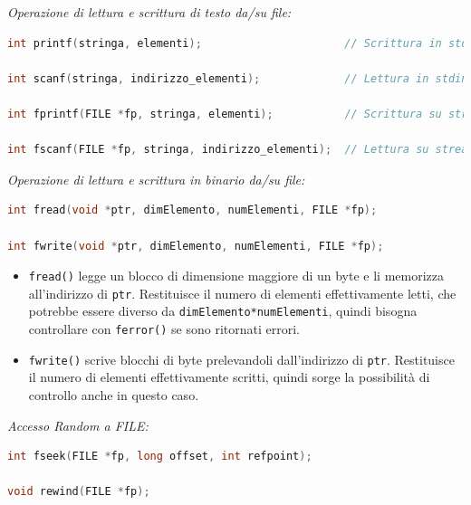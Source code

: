 \documentclass[
  paper=a4,
  oneside  ,captions=tableheading
]{scrbook}
\newcommand{\passthrough}[1]{#1}
\providecommand{\tightlist}{%
  \setlength{\itemsep}{0pt}\setlength{\parskip}{0pt}}
\begin{document}
\emph{Operazione di lettura e scrittura di testo da/su file:}

\begin{lstlisting}[language=C]
int printf(stringa, elementi);                      // Scrittura in stdout

int scanf(stringa, indirizzo_elementi);             // Lettura in stdin

int fprintf(FILE *fp, stringa, elementi);           // Scrittura su stream di tipo FILE

int fscanf(FILE *fp, stringa, indirizzo_elementi);  // Lettura su stream tipo FILE
\end{lstlisting}

\emph{Operazione di lettura e scrittura in binario da/su file:}

\begin{lstlisting}[language=C]
int fread(void *ptr, dimElemento, numElementi, FILE *fp);

int fwrite(void *ptr, dimElemento, numElementi, FILE *fp);
\end{lstlisting}

\begin{itemize}
\tightlist
\item
  \passthrough{\lstinline!fread()!} legge un blocco di dimensione
  maggiore di un byte e li memorizza all'indirizzo di
  \passthrough{\lstinline!ptr!}. Restituisce il numero di elementi
  effettivamente letti, che potrebbe essere diverso da
  \passthrough{\lstinline!dimElemento*numElementi!}, quindi bisogna
  controllare con \passthrough{\lstinline!ferror()!} se sono ritornati
  errori.
\item
  \passthrough{\lstinline!fwrite()!} scrive blocchi di byte prelevandoli
  dall'indirizzo di \passthrough{\lstinline!ptr!}. Restituisce il numero
  di elementi effettivamente scritti, quindi sorge la possibilità di
  controllo anche in questo caso.
\end{itemize}

\emph{Accesso Random a FILE:}

\begin{lstlisting}[language=C]
int fseek(FILE *fp, long offset, int refpoint);

void rewind(FILE *fp);
\end{lstlisting}
\end{document}
